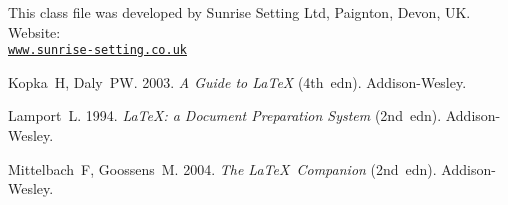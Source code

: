 \documentclass[times]{qjrms4}
\begin{document}
\ack This class file was developed by Sunrise Setting Ltd,
Paignton, Devon, UK. Website:\\
\href{http://www.sunrise-setting.co.uk}{\texttt{www.sunrise-setting.co.uk}}

\begin{thebibliography}{99}
Kopka~H, Daly~PW. 2003. \emph{A Guide to \LaTeX} (4th~edn).
Addison-Wesley.

Lamport~L. 1994. \emph{\LaTeX: a Document Preparation System}
(2nd~edn). Addison-Wesley.

Mittelbach~F, Goossens~M. 2004. \emph{The \LaTeX\ Companion}
(2nd~edn). Addison-Wesley.

\end{thebibliography}
\end{document}
